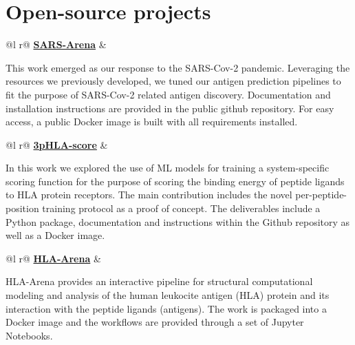 \documentclass[a4paper,12pt]{article}
\begin{document}

\section{Open-source projects}

\begin{tabularx}{\linewidth}{ @{}l r@{} }
 \href{https://github.com/KavrakiLab/SARS-Arena}{\faGithub \textbf{SARS-Arena}} &\\[3.75pt]
\begin{minipage}[t]{\linewidth}
This work emerged as our response to the SARS-Cov-2 pandemic. Leveraging the resources we previously developed, we tuned our antigen prediction pipelines to fit the purpose of SARS-Cov-2 related antigen discovery. Documentation and installation instructions are provided in the public github repository. For easy access, a public Docker image is built with all requirements installed.      
\end{minipage}
\end{tabularx}

\begin{tabularx}{\linewidth}{ @{}l r@{} }
 \href{https://github.com/KavrakiLab/3pHLA-score}{\faGithub \textbf{3pHLA-score}} &\\[3.75pt]
\begin{minipage}[t]{\linewidth}
In this work we explored the use of ML models for training a system-specific scoring function for the purpose of scoring the binding energy of peptide ligands to HLA protein receptors. The main contribution includes the novel per-peptide-position training protocol as a proof of concept. The deliverables include a Python package, documentation and instructions within the Github repository as well as a Docker image.
\end{minipage}
\end{tabularx}

\begin{tabularx}{\linewidth}{ @{}l r@{} }
 \href{https://github.com/KavrakiLab/HLA-Arena}{\faGithub \textbf{HLA-Arena}} &\\[3.75pt]
\begin{minipage}[t]{\linewidth}
HLA-Arena provides an interactive pipeline for structural computational modeling and analysis of the human leukocite antigen (HLA) protein and its interaction with the peptide ligands (antigens). The work is packaged into a Docker image and the workflows are provided through a set of Jupyter Notebooks.
\end{minipage}
\end{tabularx}
\end{document}
